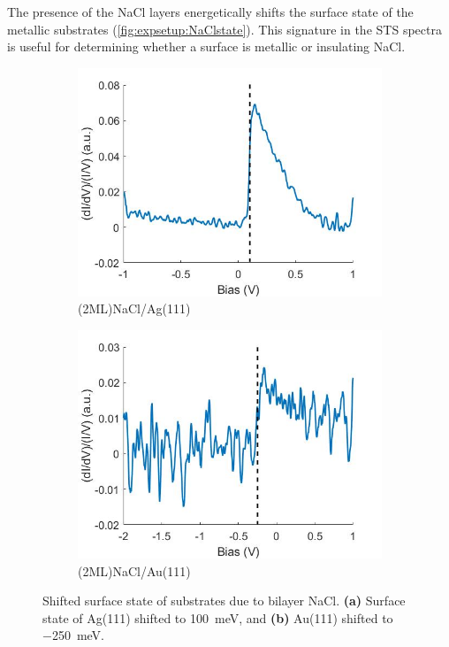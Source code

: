 The presence of the NaCl layers energetically shifts the surface state of the metallic substrates (\autoref{fig:expsetup:NaClstate}). This signature in the \ac{STS} spectra is useful for determining whether a surface is metallic or insulating NaCl.

\begin{figure} [H]
    \centering
    \begin{subfigure}[t]{0.49\textwidth}
    \includegraphics[width=\textwidth]{pictures/2mlnacl_ag111_surface_state.jpg}
    \caption{(2ML)NaCl/Ag(111)}
    \end{subfigure}
    \hfill
    \begin{subfigure}[t]{0.48\textwidth}
    \includegraphics[width=\textwidth]{pictures/2mlnacl_au111_surface_state.jpg}
    \caption{(2ML)NaCl/Au(111)}
    \end{subfigure}
    
    \caption{Shifted surface state of substrates due to bilayer NaCl. \textbf{(a)} Surface state of Ag(111) shifted to \SI{+100}{meV}, and \textbf{(b)} Au(111) shifted to \SI{-250}{meV}.}
    \label{fig:expsetup:NaClstate}
\end{figure}

